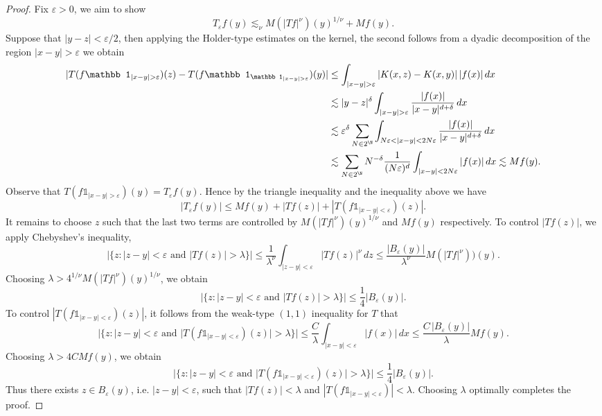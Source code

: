 \documentclass[reqno]{amsart}
\theoremstyle{definition}
\theoremstyle{remark}
\renewcommand{\epsilon}{\varepsilon}
\begin{document}
\begin{proof}
	Fix $\epsilon > 0$, we aim to show 
		\[ T_\epsilon f(y) \lesssim_\nu M(|Tf|^\nu) (y)^{1/\nu} + Mf(y). \]
	Suppose that $|y - z| < \epsilon/2$, then applying the Holder-type estimates on the kernel, the second follows from a dyadic decomposition of the region $|x - y| > \epsilon$ we obtain
		\begin{align*}
			|T(f \mathbb 1_{|x - y| > \epsilon}) (z) - T(f \mathbb 1_{\mathbb 1_{|x - y| > \epsilon}}) (y)|
				&\leq \int_{|x - y| > \epsilon} |K(x, z) - K(x, y)| \, |f(x)| \, dx  \\
				&\lesssim |y - z|^\delta \int_{|x - y| > \epsilon} \frac{|f(x)|}{|x - y|^{d + \delta}} \, dx \\
				&\lesssim \epsilon^\delta \sum_{N \in 2^\N} \int_{N\epsilon < |x - y| < 2N \epsilon} \frac{|f(x)|}{|x - y|^{d + \delta}} \, dx \\
				&\lesssim  \sum_{N \in 2^\N} N^{-\delta} \frac{1}{(N\epsilon)^d}\int_{|x - y| < 2N \epsilon} |f(x)| \, dx \lesssim Mf(y).
		\end{align*}	
	Observe that $T (f \mathbb 1_{|x - y| > \epsilon}) (y) = T_\epsilon f(y)$. Hence by the triangle inequality and the inequality above we have
		\[ |T_\epsilon f(y)| \leq Mf (y)+ |T f(z)|+ |T(f \mathbb 1_{|x - y| < \epsilon}) (z)|.\]
	It remains to choose $z$ such that the last two terms are controlled by $M(|Tf|^\nu) (y)^{1/\nu}$ and $Mf(y)$ respectively. To control $|Tf(z)|$, we apply Chebyshev's inequality, 
		\[ |\{ z : |z - y|< \epsilon \text{ and } |Tf(z)| > \lambda \}| \leq \frac{1}{\lambda^\nu} \int_{|z - y| < \epsilon} |Tf(z)|^\nu \, d z \leq \frac{|B_{\epsilon} (y)|}{\lambda^\nu} M(|Tf|^\nu))(y).\]
	Choosing $\lambda > 4^{1/\nu} M(|Tf|^\nu) (y)^{1/\nu}$, we obtain
		\[ |\{ z : |z - y|< \epsilon \text{ and } |Tf(z)| > \lambda \}| \leq \frac14 |B_{\epsilon} (y)|. \]	
	To control $|T(f \mathbb 1_{|x - y| < \epsilon})(z)|$, it follows from the weak-type $(1 ,1)$ inequality for $T$ that
		\[ |\{ z : |z - y|< \epsilon \text{ and } |T(f \mathbb 1_{|x - y| < \epsilon})(z)| > \lambda \}| \leq \frac{C}{\lambda} \int_{|x - y| < \epsilon} |f(x)| \, dx \leq \frac{C \, |B_\epsilon (y)|}{\lambda} Mf (y). \]	
	Choosing $\lambda > 4C Mf (y)$, we obtain
		\[  |\{ z : |z - y|< \epsilon \text{ and } |T(f \mathbb 1_{|x - y| < \epsilon})(z)| > \lambda \}| \leq \frac14 |B_\epsilon (y)|. \]
	Thus there exists $z \in B_{\epsilon} (y)$, i.e. $|z - y| < \epsilon$, such that $|Tf(z)| < \lambda$ and $|T(f\mathbb 1_{|x - y| < \epsilon})| < \lambda$. Choosing $\lambda$ optimally completes the proof. 
\end{proof}
\end{document}
